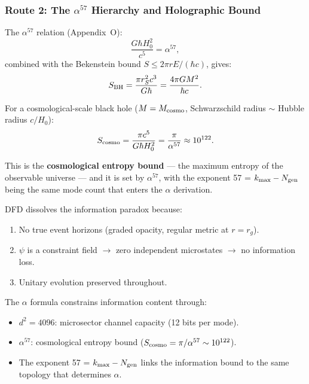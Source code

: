 \documentclass[11pt,a4paper]{article}
\begin{document}
\subsubsection{Route 2: The $\alpha^{57}$ Hierarchy and Holographic Bound}

The $\alpha^{57}$ relation (Appendix~O):
\begin{equation}
\frac{G\hbar H_0^2}{c^5} = \alpha^{57},
\end{equation}
combined with the Bekenstein bound $S \leq 2\pi r E/(\hbar c)$, gives:
\begin{equation}
S_{\rm BH} = \frac{\pi r_S^2 c^3}{G\hbar} = \frac{4\pi G M^2}{\hbar c}.
\end{equation}

For a cosmological-scale black hole ($M = M_{\rm cosmo}$, Schwarzschild radius $\sim$ Hubble radius $c/H_0$):
\begin{equation}
S_{\rm cosmo} = \frac{\pi c^5}{G\hbar H_0^2} = \frac{\pi}{\alpha^{57}} \approx 10^{122}.
\end{equation}

This is the \textbf{cosmological entropy bound} --- the maximum entropy of the observable universe --- and it is set by $\alpha^{57}$, with the exponent 57 = $k_{\max} - N_{\rm gen}$ being the same mode count that enters the $\alpha$ derivation.

\begin{tcolorbox}[colback=green!5!white, colframe=green!50!black, title=Information Paradox: Dissolved]
DFD dissolves the information paradox because:
\begin{enumerate}
\item No true event horizons (graded opacity, regular metric at $r = r_g$).
\item $\psi$ is a constraint field $\to$ zero independent microstates $\to$ no information loss.
\item Unitary evolution preserved throughout.
\end{enumerate}

The $\alpha$ formula constrains information content through:
\begin{itemize}
\item $d^2 = 4096$: microsector channel capacity (12 bits per mode).
\item $\alpha^{57}$: cosmological entropy bound ($S_{\rm cosmo} = \pi/\alpha^{57} \sim 10^{122}$).
\item The exponent 57 = $k_{\max} - N_{\rm gen}$ links the information bound to the same topology that determines $\alpha$.
\end{itemize}
\end{tcolorbox}
\end{document}

